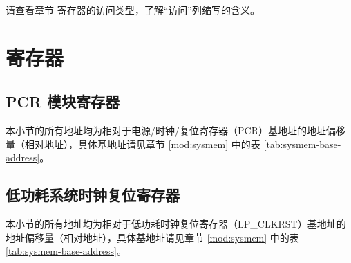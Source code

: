 \documentclass[main\_\_CN.tex]{subfiles}
\begin{document}
请查看章节 \hyperref[glossary-access-types]{寄存器的访问类型}，了解“访问”列缩写的含义。






\newpage
\section{寄存器}

\subsection{PCR 模块寄存器}


本小节的所有地址均为相对于电源/时钟/复位寄存器（PCR）基地址的地址偏移量（相对地址），具体基地址请见章节 \ref{mod:sysmem} \textit{} 中的表 \ref{tab:sysmem-base-address}。





\subsection{低功耗系统时钟复位寄存器}


本小节的所有地址均为相对于低功耗时钟复位寄存器（LP\_CLKRST）基地址的地址偏移量（相对地址），具体基地址请见章节 \ref{mod:sysmem} \textit{} 中的表 \ref{tab:sysmem-base-address}。



\end{document}
